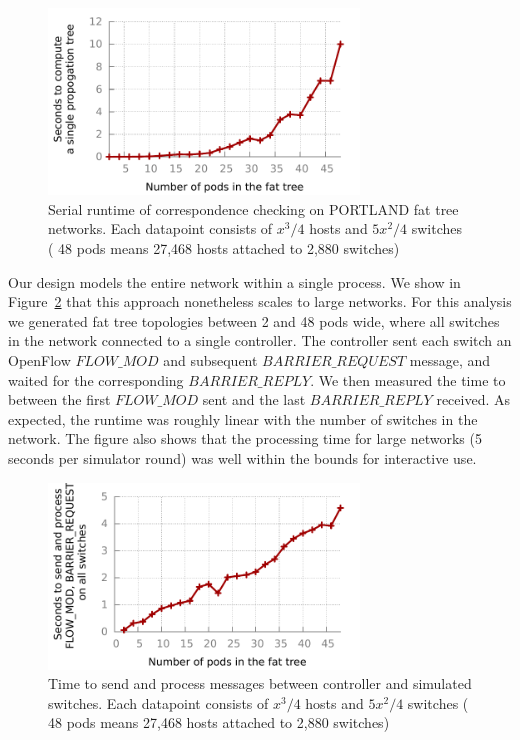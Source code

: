 {\begin{figure}[t]
    \includegraphics[width=3.25in]{../graphs/hsa_overhead_graph/graph.pdf}
    \caption[]{\label{fig:hsa_runtime} Serial runtime of correspondence
    checking on PORTLAND fat tree networks. Each datapoint consists of
    $x^3/4$ hosts and $5x^2/4$ switches (\eg{} 48 pods means 27,468 hosts
    attached to 2,880 switches)}
\end{figure}

 Our design models the entire network
within a single process. We show in Figure~\ref{fig:scalability}
that this approach nonetheless scales to large networks. For this analysis we
generated fat tree topologies between 2 and 48 pods wide, where all switches in
the network connected to a single controller. The controller sent each switch
an OpenFlow
$FLOW\_MOD$ and subsequent $BARRIER\_REQUEST$ message, and waited for the
corresponding $BARRIER\_REPLY$. We then measured the time to between the first
$FLOW\_MOD$ sent and the last $BARRIER\_REPLY$ received. As expected, the
runtime was roughly linear with the number of switches in the network. The
figure also shows that the processing time for large networks (5 seconds per
simulator round) was well within the bounds for interactive use.

\begin{figure}[t]
    \includegraphics[width=3.25in]{../graphs/scalability_graph/scale.pdf}
    \caption[]{\label{fig:scalability} Time to send and process messages
    between controller and simulated switches. Each datapoint consists of
    $x^3/4$ hosts and $5x^2/4$ switches (\eg{} 48 pods means 27,468 hosts
    attached to 2,880 switches)}
\end{figure}

}
